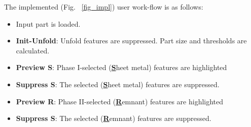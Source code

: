 The implemented (Fig. ~\ref{fig_impl}) user work-flow is as follows:
\begin{itemize}
[noitemsep,topsep=2pt,parsep=2pt,partopsep=2pt,label=\textbullet, leftmargin=*]
\item Input part is loaded.
\item \textbf{Init-Unfold}: Unfold features are suppressed. Part size and thresholds are calculated.
\item \textbf{Preview S}: Phase I-selected (\underline{\bf S}heet metal) features are highlighted
\item \textbf{Suppress S}: The selected (\underline{\bf S}heet metal) features are suppressed.
\item \textbf{Preview R}: Phase II-selected (\underline{\bf R}emnant) features are highlighted
\item \textbf{Suppress S}: The selected (\underline{\bf R}emnant) features are suppressed.
\end{itemize}